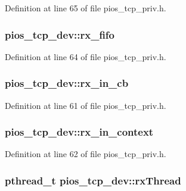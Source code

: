 Definition at line 65 of file pios\-\_\-tcp\-\_\-priv.\-h.

\hypertarget{structpios__tcp__dev_a48ebec48fa9790acf34536e86954760e}{
\subsubsection[{rx\-\_\-fifo}]{ pios\-\_\-tcp\-\_\-dev\-::rx\-\_\-fifo}}\label{structpios__tcp__dev_a48ebec48fa9790acf34536e86954760e}


Definition at line 64 of file pios\-\_\-tcp\-\_\-priv.\-h.

\hypertarget{structpios__tcp__dev_a0e3c94ab5a2e01eb6a1e09338346daa3}{
\subsubsection[{rx\-\_\-in\-\_\-cb}]{ pios\-\_\-tcp\-\_\-dev\-::rx\-\_\-in\-\_\-cb}}\label{structpios__tcp__dev_a0e3c94ab5a2e01eb6a1e09338346daa3}


Definition at line 61 of file pios\-\_\-tcp\-\_\-priv.\-h.

\hypertarget{structpios__tcp__dev_a55e947335052394bec5578cf78c4a089}{
\subsubsection[{rx\-\_\-in\-\_\-context}]{ pios\-\_\-tcp\-\_\-dev\-::rx\-\_\-in\-\_\-context}}\label{structpios__tcp__dev_a55e947335052394bec5578cf78c4a089}


Definition at line 62 of file pios\-\_\-tcp\-\_\-priv.\-h.

\hypertarget{structpios__tcp__dev_a48c0294adf726feb583ac5ddd52e2571}{
\subsubsection[{rx\-Thread}]{\setlength{\rightskip}{0pt plus 5cm}pthread\-\_\-t pios\-\_\-tcp\-\_\-dev\-::rx\-Thread}}\label{structpios__tcp__dev_a48c0294adf726feb583ac5ddd52e2571}


